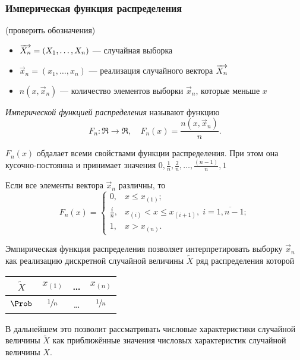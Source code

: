 \subsubsection{Империческая функция распределения}

(проверить обозначения)
\begin{itemize}
	\item $\overrightarrow{X_n} = (X_1, \ldots, X_n)$ --- случайная выборка
	\item $\vec{x}_n = (x_1, \dots, x_n)$ --- реализация случайного вектора $\overrightarrow{X_n}$ 
	\item $n(x, \vec{x}_n)$ --- количество элементов выборки $\vec{x}_n$, которые меньше $x$
\end{itemize}

\begin{defn}
	\emph{Имперической функцией распределения} называют функцию
	\[
		F_n\colon \Re \to \Re, \quad F_n(x) = \frac{n(x, \vec{x}_n)}{n}.
	\]
\end{defn}
\begin{rem}
	$F_n(x)$ обдалает всеми свойствами функции распределения. При этом она кусочно-постоянна и принимает значения $0, \frac{1}{n}, \frac{2}{n}, \ldots, \frac{(n-1)}{n}, 1$
\end{rem}
\begin{rem}
	Если все элементы вектора $\vec{x}_n$ различны, то
	\[
		F_n(x) = 
		\begin{cases}
			0, & x \leq x_{(1)}; \\
			\frac{i}{n}, & x_{(i)} < x \leq x_{(i+1)},\; i = \overline{1, n-1}; \\
			1, & x > x_{(n)}.
		\end{cases}
	\]
\end{rem}
\begin{rem}
	Эмпирическая функция распределения позволяет интерпретировать выборку $\vec{x}_n$ как реализацию дискретной случайной величины $\widetilde{X}$ ряд распределения которой
	\begin{center}
		\renewcommand{\arraystretch}{1.5}
		\begin{tabular}{| c || c | c | c |}
		\hline
		$\widetilde{X}$ & $x_{(1)}$ & \ldots & $x_{(n)}$ \\
		\hline
		$\Prob$ & $\sfrac{1}{n}$ & \ldots & $\sfrac{1}{n}$ \\
		\hline
		\end{tabular}
	\end{center}
	В дальнейшем это позволит рассматривать числовые характеристики случайной величины $\widetilde{X}$ как приближённые значения числовых характеристик случайной величины $X$.
\end{rem}


